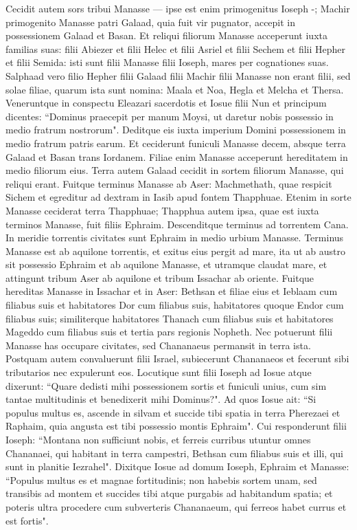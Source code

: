 \begin{biblechapter}  
\verse Cecidit autem sors tribui Manasse — ipse est enim primogenitus Ioseph -; Machir primogenito Manasse patri Galaad, quia fuit vir pugnator, accepit in possessionem Galaad et Basan. 
\verse Et reliqui filiorum Manasse acceperunt iuxta familias suas: filii Abiezer et filii Helec et filii Asriel et filii Sechem et filii Hepher et filii Semida: isti sunt filii Manasse filii Ioseph, mares per cognationes suas. 
\verse Salphaad vero filio Hepher filii Galaad filii Machir filii Manasse non erant filii, sed solae filiae, quarum ista sunt nomina: Maala et Noa, Hegla et Melcha et Thersa. 
\verse Veneruntque in conspectu Eleazari sacerdotis et Iosue filii Nun et principum dicentes: “Dominus praecepit per manum Moysi, ut daretur nobis possessio in medio fratrum nostrorum". Deditque eis iuxta imperium Domini possessionem in medio fratrum patris earum. 
\verse Et ceciderunt funiculi Manasse decem, absque terra Galaad et Basan trans Iordanem.  
\verse Filiae enim Manasse acceperunt hereditatem in medio filiorum eius. Terra autem Galaad cecidit in sortem filiorum Manasse, qui reliqui erant. 
\verse Fuitque terminus Manasse ab Aser: Machmethath, quae respicit Sichem et egreditur ad dextram in Iasib apud fontem Thapphuae. 
\verse Etenim in sorte Manasse ceciderat terra Thapphuae; Thapphua autem ipsa, quae est iuxta terminos Manasse, fuit filiis Ephraim. 
\verse Descenditque terminus ad torrentem Cana. In meridie torrentis civitates sunt Ephraim in medio urbium Manasse. Terminus Manasse est ab aquilone torrentis, et exitus eius pergit ad mare, 
\verse ita ut ab austro sit possessio Ephraim et ab aquilone Manasse, et utramque claudat mare, et attingunt tribum Aser ab aquilone et tribum Issachar ab oriente. 
\verse Fuitque hereditas Manasse in Issachar et in Aser: Bethsan et filiae eius et Ieblaam cum filiabus suis et habitatores Dor cum filiabus suis, habitatores quoque Endor cum filiabus suis; similiterque habitatores Thanach cum filiabus suis et habitatores Mageddo cum filiabus suis et tertia pars regionis Nopheth.  
\verse Nec potuerunt filii Manasse has occupare civitates, sed Chananaeus permansit in terra ista. 
\verse Postquam autem convaluerunt filii Israel, subiecerunt Chananaeos et fecerunt sibi tributarios nec expulerunt eos. 
\verse Locutique sunt filii Ioseph ad Iosue atque dixerunt: “Quare dedisti mihi possessionem sortis et funiculi unius, cum sim tantae multitudinis et benedixerit mihi Dominus?". 
\verse Ad quos Iosue ait: “Si populus multus es, ascende in silvam et succide tibi spatia in terra Pherezaei et Raphaim, quia angusta est tibi possessio montis Ephraim". 
\verse Cui responderunt filii Ioseph: “Montana non sufficiunt nobis, et ferreis curribus utuntur omnes Chananaei, qui habitant in terra campestri, Bethsan cum filiabus suis et illi, qui sunt in planitie Iezrahel". 
\verse Dixitque Iosue ad domum Ioseph, Ephraim et Manasse: “Populus multus es et magnae fortitudinis; non habebis sortem unam,  
\verse sed transibis ad montem et succides tibi atque purgabis ad habitandum spatia; et poteris ultra procedere cum subverteris Chananaeum, qui ferreos habet currus et est fortis". 
\end{biblechapter}

